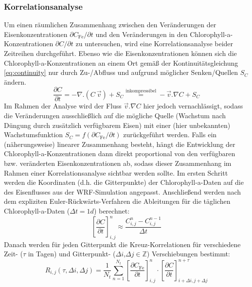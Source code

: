 \documentclass[12pt,a4paper,onecolumn]{scrartcl}
\begin{document}
\subsubsection{Korrelationsanalyse} \label{sec:methods_correlation}
Um einen räumlichen Zusammenhang zwischen den Veränderungen der Eisenkonzentrationen $\partial C_\text{Fe} / \partial t$ und den Veränderungen in den Chlorophyll-a-Konzentrationen $\partial C / \partial t$ zu untersuchen, wird eine Korrelationsanalyse beider Zeitreihen durchgeführt. Ebenso wie die Eisenkonzentrationen können sich die Chlorophyll-a-Konzentrationen an einem Ort gemäß der Kontinuitätsgleichung \ref{eq:continuity} nur durch Zu-/Abfluss und aufgrund möglicher Senken/Quellen $S_C$ ändern.
\begin{equation}
\frac{\partial C}{\partial t} = - \nabla . (C \ \vec{v}) + S_C  \overset{\text{inkompressibel}}{=} - \vec{v}.\nabla C + S_C \label{eq:continuity}
\end{equation}
Im Rahmen der Analyse wird der Fluss $\vec{v}.\nabla C$ hier jedoch vernachlässigt, sodass die Veränderungen ausschließlich auf die mögliche Quelle (Wachstum nach Düngung durch zusätzlich verfügbarem Eisen) mit einer (hier unbekannten) Wachstumsfunktion $S_C = f(\partial C_\text{Fe} / \partial t)$ zurückgeführt werden. Falls ein (näherungsweise) linearer Zusammenhang besteht, hängt die Entwicklung der Chlorophyll-a-Konzentrationen dann direkt proportional von den verfügbaren bzw. veränderten Eisenkonzentrationen ab, sodass dieser Zusammenhang im Rahmen einer Korrelationsanalyse sichtbar werden sollte. Im ersten Schritt werden die Koordinaten (d.h. die Gitterpunkte) der Chlorophyll-a-Daten auf die des Eisenflusses aus der WRF-Simulation angepasst. Anschließend werden nach dem expliziten Euler-Rückwärts-Verfahren die Ableitungen für die täglichen Chlorophyll-a-Daten ($\Delta t = 1d$) berechnet:
\begin{equation}
\left[\frac{\partial C}{\partial t}\right]_{i,j}^{n} \approx \frac{C_{i,j}^n-C_{i,j}^{n-1}}{\Delta t}
\end{equation}
Danach werden für jeden Gitterpunkt die Kreuz-Korrelationen für verschiedene Zeit- ($\tau$ in Tagen) und Gitterpunkt- ($\Delta i$,$\Delta j \in \mathbb{Z}$) Verschiebungen bestimmt:
\begin{equation}
R_{i,j}(\tau,\Delta i, \Delta j)= \frac{1}{N_t}\sum\limits_{n=1}^{N_t} \left[\frac{\partial C_\text{Fe}}{\partial t}\right]_{i,j}^n \cdot \left[\frac{\partial C}{\partial t}\right]_{i+\Delta i ,j+\Delta j}^{n+\tau}
\end{equation}
\end{document}
